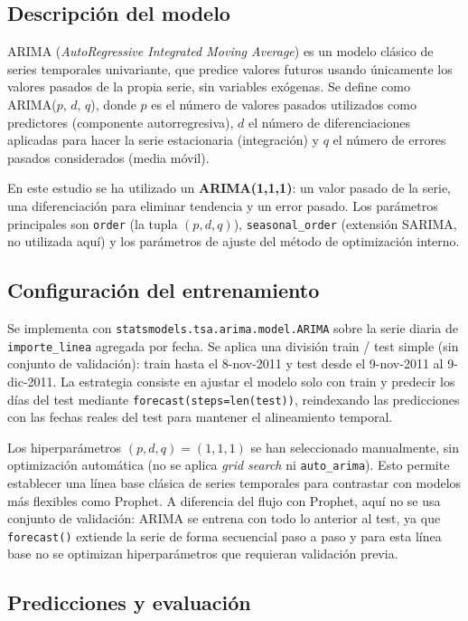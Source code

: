 \documentclass[11pt,a4paper]{article}
\begin{document}
\subsection{Descripción del modelo}

ARIMA (\textit{AutoRegressive Integrated Moving Average}) es un modelo clásico de series temporales univariante, que predice valores futuros usando únicamente los valores pasados de la propia serie, sin variables exógenas. Se define como ARIMA($p$, $d$, $q$), donde $p$ es el número de valores pasados utilizados como predictores (componente autorregresiva), $d$ el número de diferenciaciones aplicadas para hacer la serie estacionaria (integración) y $q$ el número de errores pasados considerados (media móvil).

En este estudio se ha utilizado un \textbf{ARIMA(1,1,1)}: un valor pasado de la serie, una diferenciación para eliminar tendencia y un error pasado. Los parámetros principales son \texttt{order} (la tupla $(p,d,q)$), \texttt{seasonal\_order} (extensión SARIMA, no utilizada aquí) y los parámetros de ajuste del método de optimización interno.

\subsection{Configuración del entrenamiento}

Se implementa con \texttt{statsmodels.tsa.arima.model.ARIMA} sobre la serie diaria de \texttt{importe\_linea} agregada por fecha. Se aplica una división train / test simple (sin conjunto de validación): train hasta el 8-nov-2011 y test desde el 9-nov-2011 al 9-dic-2011. La estrategia consiste en ajustar el modelo solo con train y predecir los días del test mediante \texttt{forecast(steps=len(test))}, reindexando las predicciones con las fechas reales del test para mantener el alineamiento temporal.

Los hiperparámetros $(p,d,q)=(1,1,1)$ se han seleccionado manualmente, sin optimización automática (no se aplica \textit{grid search} ni \texttt{auto\_arima}). Esto permite establecer una línea base clásica de series temporales para contrastar con modelos más flexibles como Prophet. A diferencia del flujo con Prophet, aquí no se usa conjunto de validación: ARIMA se entrena con todo lo anterior al test, ya que \texttt{forecast()} extiende la serie de forma secuencial paso a paso y para esta línea base no se optimizan hiperparámetros que requieran validación previa.

\subsection{Predicciones y evaluación}
\end{document}
